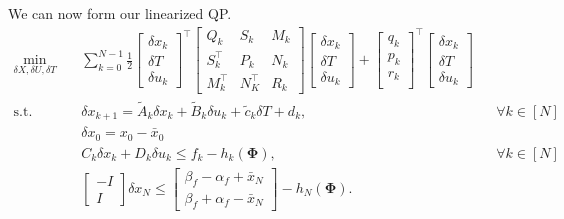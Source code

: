 \documentclass{article}
\begin{document}
We can now form our linearized QP.
\begin{subequations}
    \begin{align}
        \min_{\delta X, \delta U, \delta T} \quad & \sum_{k = 0}^{N - 1} \frac{1}{2} \begin{bmatrix}
            \delta x_k \\
            \delta T \\
            \delta u_k 
        \end{bmatrix}^\top
        \begin{bmatrix}
            Q_k & S_k & M_k \\
            S_k^\top & P_k & N_k \\
            M_k^\top & N_K^\top & R_k
        \end{bmatrix}
        \begin{bmatrix}
            \delta x_k \\
            \delta T \\
            \delta u_k
        \end{bmatrix}
        +
        \begin{bmatrix}
            q_k \\
            p_k \\
            r_k \\
        \end{bmatrix}^\top
        \begin{bmatrix}
            \delta x_k \\
            \delta T \\
            \delta u_k
        \end{bmatrix} \\
        \text{s.t.} \quad & \delta x_{k+1} = \tilde{A}_k \delta x_k + \tilde{B}_k \delta u_k + \tilde{c}_k \delta T + d_k, && \forall k \in [N]\\
        & \delta x_0 = x_0 - \bar{x}_0 \\
        & C_k \delta x_k + D_k \delta u_k \leq f_k - h_k(\mathbf{\Phi}), && \forall k \in [N] \\
        & \begin{bmatrix}
            -I \\
            I
        \end{bmatrix}
        \delta x_N
        \leq
        \begin{bmatrix}
            \beta_f - \alpha_f + \bar x_N \\
            \beta_f + \alpha_f - \bar x_N
        \end{bmatrix}
        -
        h_N(\mathbf{\Phi}).
    \end{align}
\end{subequations}
\end{document}
